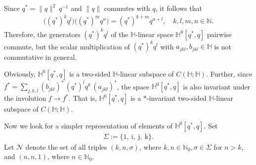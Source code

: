 \documentclass[11pt,a4paper]{amsart}
\theoremstyle{definition}
\begin{document}
Since $q^{*}=\|q\|^{2}\, q^{-1}$ and $\|q\|$ commutes with $q$, it follows
that
%
\begin{align}
\label{qmqngenerators}
\big( (q^{*})^{k} q^{l}\big)\big( (q^{*})^{m} q^{n} \big)= (q^{*})^{k+m}q^{n+l}
, \quad k,l,m,n\in \mathbb{N}.
\end{align}
%
Therefore, the generators $(q^{*})^{k} q^{l}$ of the $\mathbb{H}$-linear
space $\mathbb{H}^{0}[q^{*}, q]$ pairwise commute, but the scalar multiplication
of $(q^{*})^{k} q^{l}$ with $a_{jkl}, b_{jkl}\in \mathbb{H}$ is not commutative
in general.

Obviously, $\mathbb{H}^{0}[q^{*}, q]$ is a two-sided $\mathbb{H}$-linear
subspace of $C(\mathbb{H};\mathbb{H})$. Further, since
$f^{*}= \sum _{j,k,l} (b_{jkl})^{*}\, (q^{*})^{l} q^{k}\, (a_{jkl})^{*}$,
the space $\mathbb{H}^{0}[q^{*}, q]$ is also invariant under the involution
$f\to f^{*}$. That is, $\mathbb{H}^{0}[q^{*}, q] $ is a $*$-invariant two-sided
$\mathbb{H}$-linear subspace of $C(\mathbb{H};\mathbb{H})$.

Now we look for a simpler representation of elements of
$\mathbb{H}^{0}[q^{*}, q]$. Set
%
\begin{align}
\label{defSigma}
\Sigma :=\{ 1, \  \mathrm{i}, \ \mathrm{j}, \  \mathrm{k}\}.
\end{align}
%
Let $ \mathcal{N}$ denote the set of all triples $(k,n,\sigma )$, where
$k,n\in \mathbb{N}_{0}, \sigma \in \Sigma $ for $n>k$, and $(n,n,1)$, where
$n\in \mathbb{N}_{0}$.
\end{document}

